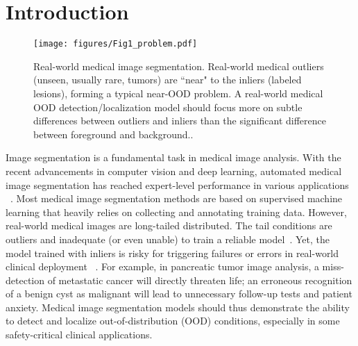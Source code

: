 \documentclass[10pt,twocolumn,letterpaper]{article}
\begin{document}
\section{Introduction}
\label{sec:intro}

\begin{figure}[t]
  \centering
   \texttt{[image: figures/Fig1\_problem.pdf]}
   \caption{Real-world medical image segmentation. Real-world medical outliers (unseen, usually rare, tumors) are ``near" to the inliers (labeled lesions), forming a typical near-OOD problem. A real-world medical OOD detection/localization model should focus more on subtle differences between outliers and inliers than the significant difference between foreground and background..}
   \label{fig:task} 
   \vspace{-5mm}
\end{figure}

Image segmentation is a fundamental task in medical image analysis. With the recent advancements in computer vision and deep learning, automated medical image segmentation has reached expert-level performance in various applications ~\cite{kickingereder2019automated,yao2022deep,bian2022artificial}. Most medical image segmentation methods are based on supervised machine learning that heavily relies on collecting and annotating training data. However, real-world medical images are long-tailed distributed. The tail conditions are outliers and inadequate (or even unable) to train a reliable model~\cite{liu2020deep,zhao20213d,zhou2021review}. Yet, the model trained with inliers is risky for triggering failures or errors in real-world clinical deployment~ \cite{roy2022does}. For example, in pancreatic tumor image analysis, a miss-detection of metastatic cancer will directly threaten life; an erroneous recognition of a benign cyst as malignant will lead to unnecessary follow-up tests and patient anxiety. Medical image segmentation models should thus demonstrate the ability to detect and localize out-of-distribution (OOD) conditions, especially in some safety-critical clinical applications.
\end{document}
